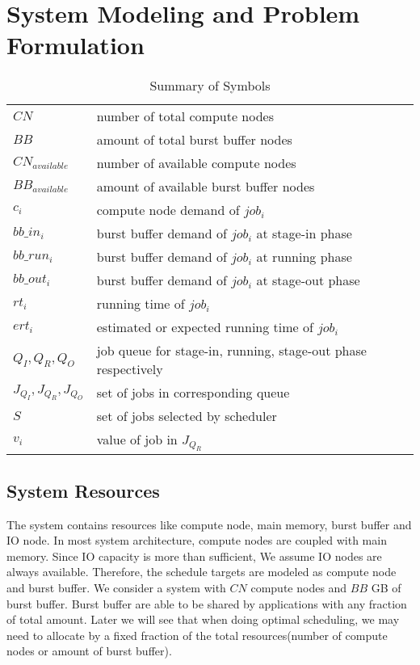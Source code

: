 \section{System Modeling and Problem Formulation}
\label{Sec:Model}

\begin{table}[!t] 
        \renewcommand{\arraystretch}{1.3}
        \caption{Summary of Symbols}
        \label{Tab:Symbols}
        \centering
        \begin{tabular}{l|l}
                \hline
                $CN$ & number of total compute nodes \\
                $BB$ & amount of total burst buffer nodes \\
                $CN_{available}$ & number of available compute nodes \\
                $BB_{available}$ & amount of available burst buffer nodes \\
                $c_i$ & compute node demand of $job_i$ \\
                $bb\_in_i$ & burst buffer demand of $job_i$ at stage-in phase \\
                $bb\_run_i$ & burst buffer demand of $job_i$ at running phase \\
                $bb\_out_i$ & burst buffer demand of $job_i$ at stage-out phase \\
                $rt_i$ & running time of $job_i$ \\
                $ert_i$ & estimated or expected running time of $job_i$ \\
                $Q_I, Q_R, Q_O$ & job queue for stage-in, running, stage-out phase respectively \\
                $J_{Q_I}, J_{Q_R}, J_{Q_O}$ & set of jobs in corresponding queue \\
                $S$ & set of jobs selected by scheduler \\
                $v_i$ & value of job in $J_{Q_R}$ \\
                \hline
        \end{tabular}
\end{table}

\subsection{System Resources}
The system contains resources like compute node, main memory, burst buffer and IO node.
In most system architecture, compute nodes are coupled with main memory.
Since IO capacity is more than sufficient, We assume IO nodes are always available.
Therefore, the schedule targets are modeled as compute node and burst buffer.
We consider a system with $CN$ compute nodes and $BB$ GB of burst buffer.
Burst buffer are able to be shared by applications with any fraction of total amount.
Later we will see that when doing optimal scheduling, we may need to allocate by a fixed
fraction of the total resources(number of compute nodes or amount of burst buffer).

